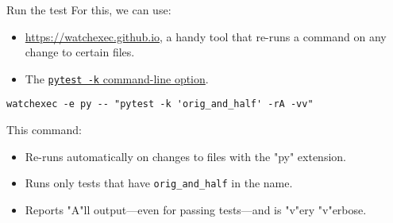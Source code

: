 \documentclass[12pt,aspectratio=169]{beamer}
\begin{document}
\begin{frame}[fragile]{Run the test}
For this, we can use:
\begin{itemize}
    \item \href{watchexec}{https://watchexec.github.io}, a handy tool that re-runs a command on any change to certain files.
    \item The \href{https://docs.pytest.org/en/stable/reference/reference.html\#command-line-flags}{\texttt{pytest -k} command-line option}.
\end{itemize}

\begin{verbatim}
watchexec -e py -- "pytest -k 'orig_and_half' -rA -vv"
\end{verbatim}
This command:
\begin{itemize}
  \item Re-runs automatically on changes to files with the "py" extension.
  \item Runs only tests that have \verb|orig_and_half| in the name.
  \item Reports "A"ll output—even for passing tests—and is "v"ery "v"erbose.
\end{itemize}
\end{frame}
\end{document}
